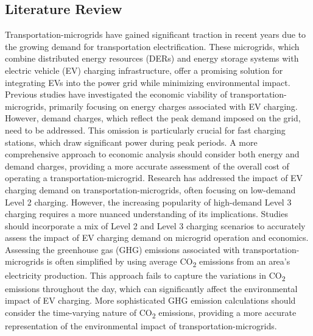 \documentclass[conference]{IEEEtran}
\begin{document}
  	\subsection{Literature Review}
  		Transportation-microgrids have gained significant traction in recent years due to the growing demand for transportation electrification. These microgrids, which combine distributed energy resources (DERs) and energy storage systems with electric vehicle (EV) charging infrastructure, offer a promising solution for integrating EVs into the power grid while minimizing environmental impact. Previous studies have investigated the economic viability of transportation-microgrids, primarily focusing on energy charges associated with EV charging. However, demand charges, which reflect the peak demand imposed on the grid, need to be addressed. This omission is particularly crucial for fast charging stations, which draw significant power during peak periods. A more comprehensive approach to economic analysis should consider both energy and demand charges, providing a more accurate assessment of the overall cost of operating a transportation-microgrid. Research has addressed the impact of EV charging demand on transportation-microgrids, often focusing on low-demand Level 2 charging. However, the increasing popularity of high-demand Level 3 charging requires a more nuanced understanding of its implications. Studies should incorporate a mix of Level 2 and Level 3 charging scenarios to accurately assess the impact of EV charging demand on microgrid operation and economics. Assessing the greenhouse gas (GHG) emissions associated with transportation-microgrids is often simplified by using average CO\textsubscript{2} emissions from an area's electricity production. This approach fails to capture the variations in CO\textsubscript{2} emissions throughout the day, which can significantly affect the environmental impact of EV charging. More sophisticated GHG emission calculations should consider the time-varying nature of CO\textsubscript{2} emissions, providing a more accurate representation of the environmental impact of transportation-microgrids. 
  		
\end{document}
